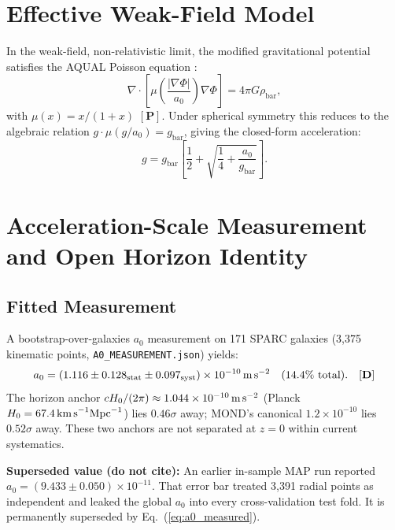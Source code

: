 \documentclass[aps,prd,preprint,superscriptaddress,nofootinbib,amsmath,amssymb,floatfix]{revtex4-2}
\begin{document}
\section{Effective Weak-Field Model}
\label{sec:model}

In the weak-field, non-relativistic limit, the modified gravitational potential satisfies the AQUAL Poisson equation \cite{Bekenstein1984}:
\begin{equation}
\label{eq:aqual_field}
\nabla \cdot \left[ \mu\!\left(\frac{|\nabla\Phi|}{a_0}\right) \nabla\Phi \right] = 4\pi G \rho_{\text{bar}},
\end{equation}
with $\mu(x) = x/(1+x)$ $\mathbf{[P]}$. Under spherical symmetry this reduces to the algebraic relation $g \cdot \mu(g/a_0) = g_{\text{bar}}$, giving the closed-form acceleration:
\begin{equation}
\label{eq:g_predict}
g = g_{\text{bar}} \left[ \frac{1}{2} + \sqrt{\frac{1}{4} + \frac{a_0}{g_{\text{bar}}}} \right].
\end{equation}

\section{Acceleration-Scale Measurement and Open Horizon Identity}
\label{sec:a0}

\subsection{Fitted Measurement}

A bootstrap-over-galaxies $a_0$ measurement on 171 SPARC galaxies (3,375 kinematic points, \texttt{A0\_MEASUREMENT.json}) yields:
\begin{equation}
\label{eq:a0_measured}
a_0 = \left(1.116 \pm 0.128_{\text{stat}} \pm 0.097_{\text{syst}}\right) \times 10^{-10}\,\text{m\,s}^{-2} \quad (14.4\%\ \text{total}). \quad \mathbf{[D]}
\end{equation}
The horizon anchor $cH_0/(2\pi) \approx 1.044 \times 10^{-10}\,\text{m\,s}^{-2}$ (Planck $H_0 = 67.4\,\text{km\,s}^{-1}\text{Mpc}^{-1}$) lies $0.46\sigma$ away; MOND's canonical $1.2 \times 10^{-10}$ lies $0.52\sigma$ away. These two anchors are not separated at $z=0$ within current systematics.

\textbf{Superseded value (do not cite):} An earlier in-sample MAP run reported $a_0 = (9.433 \pm 0.050) \times 10^{-11}$. That error bar treated 3,391 radial points as independent and leaked the global $a_0$ into every cross-validation test fold. It is permanently superseded by Eq.~(\ref{eq:a0_measured}).
\end{document}
